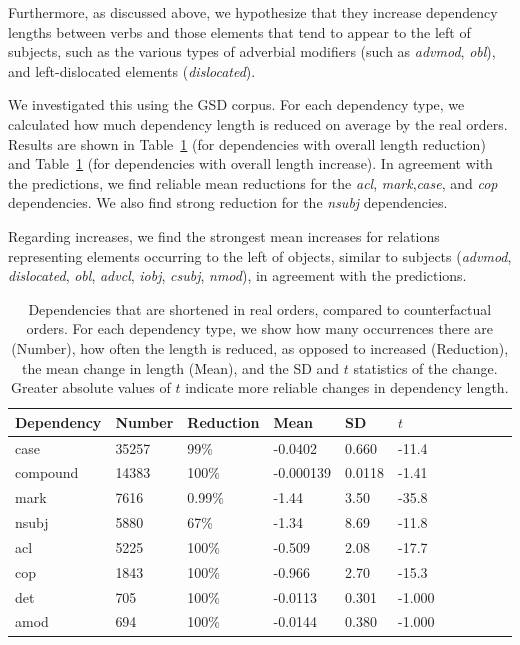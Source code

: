 \documentclass[11pt,a4paper]{article}
\begin{document}
Furthermore, as discussed above, we hypothesize that they increase dependency lengths between verbs and those elements that tend to appear to the left of subjects, such as the various types of adverbial modifiers (such as \textit{advmod}, \textit{obl}), and left-dislocated elements (\textit{dislocated}).

We investigated this using the GSD corpus.
For each dependency type, we calculated how much dependency length is reduced on average by the real orders.
Results are shown in Table~\ref{fig:shortened} (for dependencies with overall length reduction) and Table~\ref{fig:shortened} (for dependencies with overall length increase).
In agreement with the predictions, we find reliable mean reductions for the \emph{acl}, \emph{mark},\emph{case}, and \emph{cop} dependencies.
We also find strong reduction for the \emph{nsubj} dependencies.


Regarding increases, we find the strongest mean increases for relations representing elements occurring to the left of objects, similar to subjects (\emph{advmod}, \emph{dislocated}, \emph{obl}, \emph{advcl}, \emph{iobj}, \emph{csubj}, \emph{nmod}), in agreement with the predictions. %

\begin{table}
\begin{center}
\begin{tabular}{l|llllllllll}
   Dependency  &Number &Reduction     &  Mean   &   SD &       $t$ \\ \hline
  case & 35257  &  99\% & -0.0402     &0.660  & -11.4   \\
 compound     &14383  &  100\%     & -0.000139   &0.0118 &  -1.41  \\ 
 mark  & 7616  &  0.99\% & -1.44       &3.50 &   -35.8   \\
  nsubj        & 5880  &  67\% & -1.34       &8.69  &  -11.8   \\
  acl          & 5225  &  100\%     & -0.509      &2.08  &  -17.7   \\
 cop   & 1843  &  100\%    &  -0.966      &2.70  &  -15.3   \\
 det          &  705  &  100\%    &  -0.0113     &0.301 &   -1.000 \\
 amod         &  694  &  100\%    &  -0.0144     &0.380 &   -1.000 \\
\end{tabular}
\end{center}
\caption{Dependencies that are shortened in real orders, compared to counterfactual orders. For each dependency type, we show how many occurrences there are (Number), how often the length is reduced, as opposed to increased (Reduction), the mean change in length (Mean), and the SD and $t$ statistics of the change. Greater absolute values of $t$ indicate more reliable changes in dependency length.}\label{fig:shortened}
\end{table}
\end{document}
